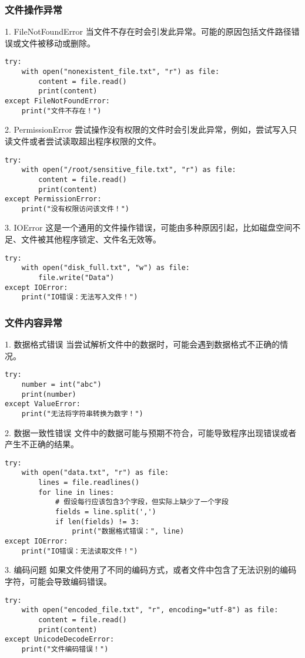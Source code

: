 \documentclass{article}
\begin{document}
\subsubsection{文件操作异常}
1. FileNotFoundError
当文件不存在时会引发此异常。可能的原因包括文件路径错误或文件被移动或删除。
\begin{lstlisting}[caption={示例Python代码}]
try:
    with open("nonexistent_file.txt", "r") as file:
        content = file.read()
        print(content)
except FileNotFoundError:
    print("文件不存在！")
\end{lstlisting}

2. PermissionError
尝试操作没有权限的文件时会引发此异常，例如，尝试写入只读文件或者尝试读取超出程序权限的文件。
\begin{lstlisting}[caption={示例Python代码}]
try:
    with open("/root/sensitive_file.txt", "r") as file:
        content = file.read()
        print(content)
except PermissionError:
    print("没有权限访问该文件！")
\end{lstlisting}
3. IOError
这是一个通用的文件操作错误，可能由多种原因引起，比如磁盘空间不足、文件被其他程序锁定、文件名无效等。
\begin{lstlisting}[caption={示例Python代码}]
try:
    with open("disk_full.txt", "w") as file:
        file.write("Data")
except IOError:
    print("IO错误：无法写入文件！")
\end{lstlisting}
\subsubsection{文件内容异常}
1. 数据格式错误
当尝试解析文件中的数据时，可能会遇到数据格式不正确的情况。
\begin{lstlisting}[caption={示例Python代码}]
try:
    number = int("abc")
    print(number)
except ValueError:
    print("无法将字符串转换为数字！")
\end{lstlisting}

2. 数据一致性错误
文件中的数据可能与预期不符合，可能导致程序出现错误或者产生不正确的结果。
\begin{lstlisting}[caption={示例Python代码}]
try:
    with open("data.txt", "r") as file:
        lines = file.readlines()
        for line in lines:
            # 假设每行应该包含3个字段，但实际上缺少了一个字段
            fields = line.split(',')
            if len(fields) != 3:
                print("数据格式错误：", line)
except IOError:
    print("IO错误：无法读取文件！")
\end{lstlisting}
3. 编码问题
如果文件使用了不同的编码方式，或者文件中包含了无法识别的编码字符，可能会导致编码错误。
\begin{lstlisting}[caption={示例Python代码}]
try:
    with open("encoded_file.txt", "r", encoding="utf-8") as file:
        content = file.read()
        print(content)
except UnicodeDecodeError:
    print("文件编码错误！")
\end{lstlisting}
\end{document}
